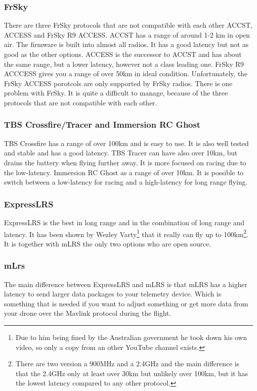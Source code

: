 \documentclass{article}
\begin{document}
	\subsubsection*{FrSky}
	There are three FrSky protocols that are not compatible with each other ACCST, ACCESS and FrSky R9 ACCESS. ACCST has a range of around 1-2 km in open air. The firmware is built into almost all radios. It has a good latency but not as good as the other options. ACCESS is the successor to ACCST and has about the same range, but a lower latency, however not a class leading one. FrSky R9 ACCCESS gives you a range of over 50km in ideal condition. Unfortunately, the FrSky ACCESS porotcols are only supported by FrSky radios. There is one problem with FrSky. It is quite a difficult to manage, because of the three protocols that are not compatible with each other.
	\subsubsection*{TBS Crossfire/Tracer and Immersion RC Ghost}
	TBS Crossfire has a range of over 100km and is easy to use. It is also well tested and stable and has a good latency. 
	TBS Tracer can have also over 10km, but drains the battery when flying further away. It is more focused on racing due to the low-latency.
	Immersion RC Ghost as a range of over 10km. It is possible to switch between a low-latency for racing and a high-latency for long range flying. 
	\subsubsection*{ExpressLRS}
	ExpressLRS is the best in long range and in the combination of long range and latency. It has been shown by Wezley Varty\cite{elrswezley}\footnote{Due to him being fined by the Australian government he took down his own video, so only a copy from an other YouTube channel exists.} that it really can fly up to 100km\footnote{There are two version a 900MHz and a 2.4GHz and the main difference is that the 2.4GHz only at least over 30km but unlikely over 100km, but it has the lowest latency compared to any other protocol.}. It is together with mLRS the only two options who are open source.
	\subsubsection*{mLrs}
	The main difference between ExpressLRS and mLRS is that mLRS has a higher latency to send larger data packages to your telemetry device. Which is something that is needed if you want to adjust something or get more data from your drone over the Mavlink protocol during the flight. 
	
\end{document}
